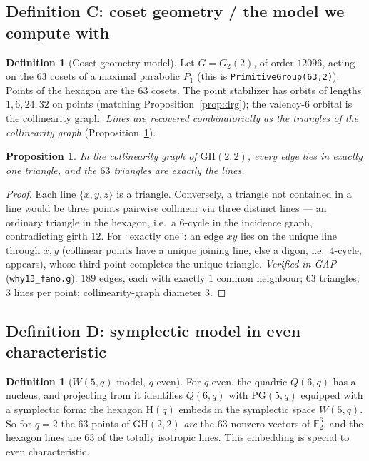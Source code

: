 \documentclass[11pt]{article}
\newtheorem{proposition}[theorem]{Proposition}
\theoremstyle{definition}
\newtheorem{definition}[theorem]{Definition}
\newcommand{\F}{\mathbb{F}}
\newcommand{\PG}{\mathrm{PG}}
\newcommand{\GH}{\mathrm{GH}}
\begin{document}
\subsection{Definition C: coset geometry / the model we compute with}

\begin{definition}[Coset geometry model]\label{def:hex-coset}
Let $G = G_2(2)$, of order $12096$, acting on the $63$ cosets of a maximal
parabolic $P_1$ (this is \texttt{PrimitiveGroup(63,2)}). Points of the
hexagon are the $63$ cosets. The point stabilizer has orbits of lengths
$1,6,24,32$ on points (matching Proposition~\ref{prop:drg}); the valency-$6$
orbital is the collinearity graph. \emph{Lines are recovered combinatorially
as the triangles of the collinearity graph}
(Proposition~\ref{prop:triangles}).
\end{definition}

\begin{proposition}\label{prop:triangles}
In the collinearity graph of $\GH(2,2)$, every edge lies in exactly one
triangle, and the $63$ triangles are exactly the lines.
\end{proposition}

\begin{proof}
Each line $\{x,y,z\}$ is a triangle. Conversely, a triangle not contained in
a line would be three points pairwise collinear via three distinct lines ---
an ordinary triangle in the hexagon, i.e.\ a $6$-cycle in the incidence
graph, contradicting girth $12$. For ``exactly one'': an edge $xy$ lies on
the unique line through $x,y$ (collinear points have a unique joining line,
else a digon, i.e.\ $4$-cycle, appears), whose third point completes the
unique triangle. \emph{Verified in GAP} (\texttt{why13\_fano.g}):
$189$ edges, each with exactly $1$ common neighbour; $63$ triangles;
$3$ lines per point; collinearity-graph diameter $3$.
\end{proof}

\subsection{Definition D: symplectic model in even characteristic}

\begin{definition}[$W(5,q)$ model, $q$ even]\label{def:hex-symplectic}
For $q$ even, the quadric $Q(6,q)$ has a nucleus, and projecting from it
identifies $Q(6,q)$ with $\PG(5,q)$ equipped with a symplectic form: the
hexagon $\mathrm H(q)$ embeds in the symplectic space $W(5,q)$. So for
$q = 2$ the $63$ points of $\GH(2,2)$ \emph{are} the $63$ nonzero vectors of
$\F_2^6$, and the hexagon lines are $63$ of the totally isotropic lines.
This embedding is special to even characteristic.
\end{definition}
\end{document}
